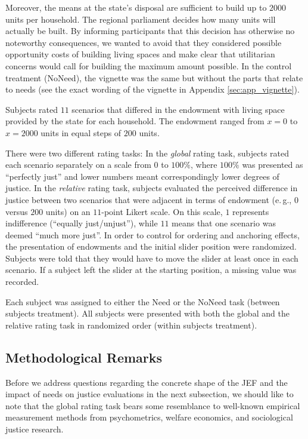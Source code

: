 \documentclass[12pt]{scrartcl}
\begin{document}
Moreover, the means at the state's disposal are sufficient to build up to $2000$ units per household.
The regional parliament decides how many units will actually be built.
By informing participants that this decision has otherwise no noteworthy consequences, we wanted to avoid that they considered possible opportunity costs of building living spaces and make clear that utilitarian concerns would call for building the maximum amount possible.
In the control treatment (NoNeed), the vignette was the same but without the parts that relate to needs (see the exact wording of the vignette in Appendix \ref{sec:app_vignette}).

Subjects rated $11$ scenarios that differed in the endowment with living space provided by the state for each household.
The endowment ranged from $x=0$ to $x=2000$ units in equal steps of $200$ units.

There were two different rating tasks: In the \textit{global} rating task, subjects rated each scenario separately on a scale from $0$ to $100\%$, where $100\%$ was presented as ``perfectly just'' and lower numbers meant correspondingly lower degrees of justice.
In the \textit{relative} rating task, subjects evaluated the perceived difference in justice between two scenarios that were adjacent in terms of endowment (e.\,g., $0$ versus $200$ units) on an $11$-point Likert scale.
On this scale, $1$ represents indifference (``equally just/unjust''), while $11$ means that one scenario was deemed ``much more just''.
In order to control for ordering and anchoring effects, the presentation of endowments and the initial slider position were randomized.
Subjects were told that they would have to move the slider at least once in each scenario.
If a subject left the slider at the starting position, a missing value was recorded.

Each subject was assigned to either the Need or the NoNeed task (between subjects treatment).
All subjects were presented with both the global and the relative rating task in randomized order (within subjects treatment).


\subsection{Methodological Remarks}\label{sec:remarks}
Before we address questions regarding the concrete shape of the JEF and the impact of needs on justice evaluations in the next subsection, we should like to note that the global rating task bears some resemblance to well-known empirical measurement methods from psychometrics, welfare economics, and sociological justice research.
\end{document}
